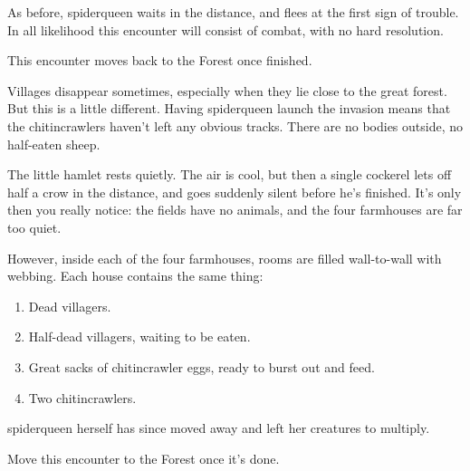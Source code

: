 \begin{multicols}{2}
As before, \gls{spiderqueen} waits in the distance, and flees at the first sign of trouble.  In all likelihood this encounter will consist of combat, with no hard resolution.

This encounter moves back to the Forest once finished.


Villages disappear sometimes, especially when they lie close to the great forest.  But this is a little different.  Having \gls{spiderqueen} launch the invasion means that the chitincrawlers haven't left any obvious tracks.  There are no bodies outside, no half-eaten sheep.

\begin{boxtext}

	The little hamlet rests quietly.
	The air is cool, but then a single cockerel lets off half a crow in the distance, and goes suddenly silent before he's finished.
	It's only then you really notice: the fields have no animals, and the four farmhouses are far too quiet.

\end{boxtext}

However, inside each of the four farmhouses, rooms are filled wall-to-wall with webbing.  Each house contains the same thing:

\begin{enumerate}

	\item{Dead villagers.}
	\item{Half-dead villagers, waiting to be eaten.}
	\item{Great sacks of chitincrawler eggs, ready to burst out and feed.}
	\item{Two chitincrawlers.}
\end{enumerate}

\Gls{spiderqueen} herself has since moved away and left her creatures to multiply.

Move this encounter to the Forest once it's done.

\vfill\null\columnbreak

\begin{figure*}[t]

	\label{ruined_village_map}\label{ruined_village_map}

\end{figure*}



\end{multicols}

